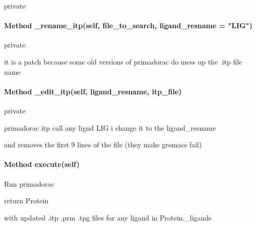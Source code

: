             private

        \paragraph{Method \_rename\_itp(self, file\_to\_search, ligand\_resname = "LIG")}
    
            private

            it is a patch because some old versions of primadorac do mess up the .itp file name

        \paragraph{Method \_edit\_itp(self, ligand\_resname, itp\_file)}
        
            private

            primadorac itp call any lignd LIG i change it to the ligand\_resname

            and removes the first 9 lines of the file (they make gromacs fail)

        \paragraph{Method execute(self)}
        
            Run primadorac

            return Protein
            
            with updated .itp .prm .tpg files for any ligand in Protein.\_ligands
